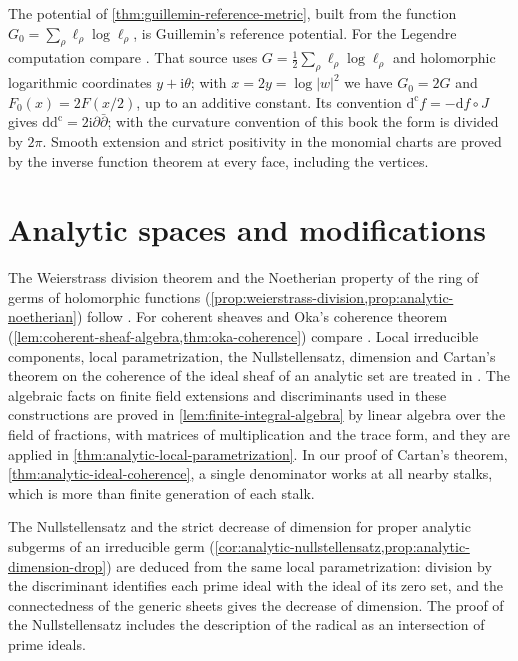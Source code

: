 The potential of \cref{thm:guillemin-reference-metric}, built from the function $G_0=\sum_\rho\ell_\rho\log\ell_\rho$, is Guillemin's reference potential. For the Legendre computation compare \cite[Proposition 2; Theorem 1]{CDG03v1}. That source uses $G=\frac12\sum_\rho\ell_\rho\log\ell_\rho$ and holomorphic logarithmic coordinates $y+\mathrm i\theta$; with $x=2y=\log|w|^2$ we have $G_0=2G$ and $F_0(x)=2F(x/2)$, up to an additive constant. Its convention $\mathrm d^{\mathrm c}f=-\mathrm df\circ J$ gives $\mathrm d\mathrm d^{\mathrm c}=2\mathrm i\partial\bar\partial$; with the curvature convention of this book the form is divided by $2\pi$. Smooth extension and strict positivity in the monomial charts are proved by the inverse function theorem at every face, including the vertices.

\section{Analytic spaces and modifications}\label{sec:history-analytic-spaces}
The Weierstrass division theorem and the Noetherian property of the ring of germs of holomorphic functions (\cref{prop:weierstrass-division,prop:analytic-noetherian}) follow \cite[Chapter II, (2.3)--(2.7)]{DemBook}. For coherent sheaves and Oka's coherence theorem (\cref{lem:coherent-sheaf-algebra,thm:oka-coherence}) compare \cite[Chapter II, (3.8)--(3.22)]{DemBook}. Local irreducible components, local parametrization, the Nullstellensatz, dimension and Cartan's theorem on the coherence of the ideal sheaf of an analytic set are treated in \cite[Chapter II, (4.1)--(4.31)]{DemBook}. The algebraic facts on finite field extensions and discriminants used in these constructions are proved in \cref{lem:finite-integral-algebra} by linear algebra over the field of fractions, with matrices of multiplication and the trace form, and they are applied in \cref{thm:analytic-local-parametrization}. In our proof of Cartan's theorem, \cref{thm:analytic-ideal-coherence}, a single denominator works at all nearby stalks, which is more than finite generation of each stalk.

The Nullstellensatz and the strict decrease of dimension for proper analytic subgerms of an irreducible germ (\cref{cor:analytic-nullstellensatz,prop:analytic-dimension-drop}) are deduced from the same local parametrization: division by the discriminant identifies each prime ideal with the ideal of its zero set, and the connectedness of the generic sheets gives the decrease of dimension. The proof of the Nullstellensatz includes the description of the radical as an intersection of prime ideals.

